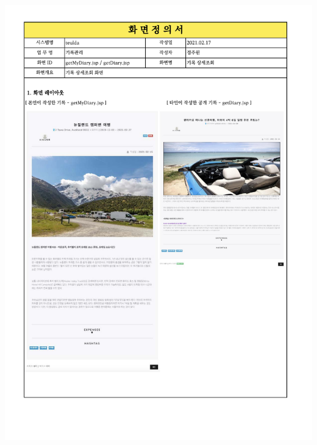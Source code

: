 {{{{{{{{{{{{{{{{{{{{{{{{\includegraphics[width=20cm]{./Figure/Design/Display/diary/diary_06.pdf} \\
}}}}}}}}}}}}}}}}}}}}}}}}
